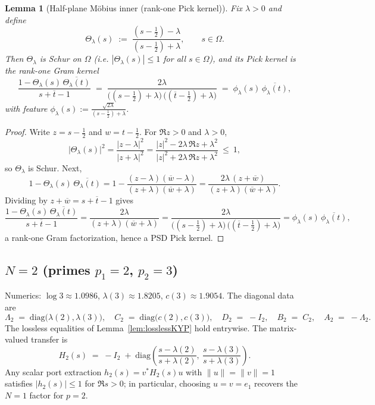 \documentclass[11pt]{article}
\newtheorem{lemma}[theorem]{Lemma}
\theoremstyle{definition}
\theoremstyle{remark}
\begin{document}
\begin{lemma}[Half-plane M\"obius inner (rank-one Pick kernel)]\label{lem:moebius-contract}
Fix \(\lambda>0\) and define
\[
  \Theta_\lambda(s)\;:=\;\frac{(s-\tfrac12)-\lambda}{(s-\tfrac12)+\lambda},\qquad s\in\Omega.
\]
Then \(\Theta_\lambda\) is Schur on \(\Omega\) (i.e. \(|\Theta_\lambda(s)|\le 1\) for all \(s\in\Omega\)), and its Pick kernel is the rank-one Gram kernel
\[
  \frac{1-\Theta_\lambda(s)\,\overline{\Theta_\lambda(t)}}{s+\overline t-1}
  \;=\; \frac{2\lambda}{\big((s-\tfrac12)+\lambda\big)\,\big((\overline t-\tfrac12)+\lambda\big)}
  \;=\; \phi_\lambda(s)\,\overline{\phi_\lambda(t)},
\]
with feature \(\displaystyle \phi_\lambda(s):=\frac{\sqrt{2\lambda}}{(s-\tfrac12)+\lambda}\).
\end{lemma}
\begin{proof}
Write \(z=s-\tfrac12\) and \(w=t-\tfrac12\). For \(\Re z>0\) and \(\lambda>0\),
\[
  \bigl|\Theta_\lambda(s)\bigr|^2
  =\frac{|z-\lambda|^2}{|z+\lambda|^2}
  =\frac{|z|^2-2\lambda\,\Re z+\lambda^2}{|z|^2+2\lambda\,\Re z+\lambda^2}\ \le\ 1,
\]
so \(\Theta_\lambda\) is Schur. Next,
\[
  1-\Theta_\lambda(s)\,\overline{\Theta_\lambda(t)}
  = 1-\frac{(z-\lambda)(\overline w-\lambda)}{(z+\lambda)(\overline w+\lambda)}
  = \frac{2\lambda\,(z+\overline w)}{(z+\lambda)(\overline w+\lambda)}.
\]
Dividing by \(z+\overline w=s+\overline t-1\) gives
\[
  \frac{1-\Theta_\lambda(s)\,\overline{\Theta_\lambda(t)}}{s+\overline t-1}
  = \frac{2\lambda}{(z+\lambda)(\overline w+\lambda)}
  = \frac{2\lambda}{\big((s-\tfrac12)+\lambda\big)\,\big((\overline t-\tfrac12)+\lambda\big)}
  = \phi_\lambda(s)\,\overline{\phi_\lambda(t)},
\]
a rank‑one Gram factorization, hence a PSD Pick kernel.
\end{proof}

\subsection*{$N=2$ (primes $p_1=2$, $p_2=3$)}
Numerics: \(\log 3\approx 1.0986\), \(\lambda(3)\approx 1.8205\), \(c(3)\approx 1.9054\). The diagonal data are
\[
 \Lambda_2\;=\;\mathrm{diag}\big(\lambda(2),\lambda(3)\big),\quad C_2\;=\;\mathrm{diag}\big(c(2),c(3)\big),\quad D_2\;=\;-I_2,\quad B_2\;=\;C_2,\quad A_2\;=\;-\Lambda_2.
\]
The lossless equalities of Lemma~\ref{lem:losslessKYP} hold entrywise. The matrix-valued transfer is
\[
 H_2(s)\;=\;-I_2\; +\; \mathrm{diag}\!\left(\frac{s-\lambda(2)}{s+\lambda(2)},\ \frac{s-\lambda(3)}{s+\lambda(3)}\right).
\]
Any scalar port extraction \(h_2(s)=v^*H_2(s)u\) with \(\|u\|=\|v\|=1\) satisfies \(|h_2(s)|\le 1\) for \(\Re s>0\); in particular, choosing \(u=v=e_1\) recovers the \(N=1\) factor for \(p=2\).
\end{document}
